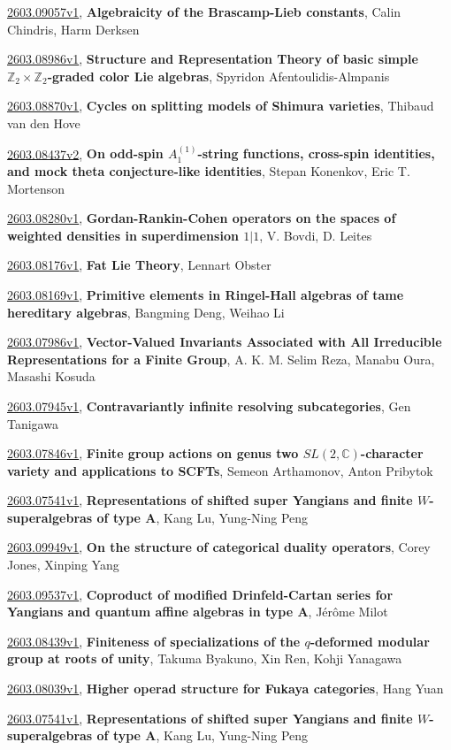 \documentclass[9pt, a4paper]{article}
\theoremstyle{plain}
\theoremstyle{definition}
\theoremstyle{remark}
\newcommand{\arxiv}[3]{\href{https://arxiv.org/abs/#1}{#1}, \textbf{\textcolor{arxivblue}{#2}}, #3}
\begin{document}
\arxiv{2603.09057v1}{Algebraicity of the Brascamp-Lieb constants}{Calin Chindris, Harm Derksen}

\arxiv{2603.08986v1}{Structure and Representation Theory of basic simple $\mathbb{Z}_2\times \mathbb{Z}_2$-graded color Lie algebras}{Spyridon Afentoulidis-Almpanis}

\arxiv{2603.08870v1}{Cycles on splitting models of Shimura varieties}{Thibaud van den Hove}

\arxiv{2603.08437v2}{On odd-spin $A_{1}^{(1)}$-string functions, cross-spin identities, and mock theta conjecture-like identities}{Stepan Konenkov, Eric T. Mortenson}

\arxiv{2603.08280v1}{Gordan-Rankin-Cohen operators on the spaces of weighted densities in superdimension $1\vert 1$}{V. Bovdi, D. Leites}

\arxiv{2603.08176v1}{Fat Lie Theory}{Lennart Obster}

\arxiv{2603.08169v1}{Primitive elements in Ringel-Hall algebras of tame hereditary algebras}{Bangming Deng, Weihao Li}

\arxiv{2603.07986v1}{Vector-Valued Invariants Associated with All Irreducible Representations for a Finite Group}{A. K. M. Selim Reza, Manabu Oura, Masashi Kosuda}

\arxiv{2603.07945v1}{Contravariantly infinite resolving subcategories}{Gen Tanigawa}

\arxiv{2603.07846v1}{Finite group actions on genus two $SL(2, \mathbb{C})$-character variety and applications to SCFTs}{Semeon Arthamonov, Anton Pribytok}

\arxiv{2603.07541v1}{Representations of shifted super Yangians and finite $W$-superalgebras of type A}{Kang Lu, Yung-Ning Peng}

\arxiv{2603.09949v1}{On the structure of categorical duality operators}{Corey Jones, Xinping Yang}

\arxiv{2603.09537v1}{Coproduct of modified Drinfeld-Cartan series for Yangians and quantum affine algebras in type A}{Jérôme Milot}

\arxiv{2603.08439v1}{Finiteness of specializations of the $q$-deformed modular group at roots of unity}{Takuma Byakuno, Xin Ren, Kohji Yanagawa}

\arxiv{2603.08039v1}{Higher operad structure for Fukaya categories}{Hang Yuan}

\arxiv{2603.07541v1}{Representations of shifted super Yangians and finite $W$-superalgebras of type A}{Kang Lu, Yung-Ning Peng}

\end{document}
